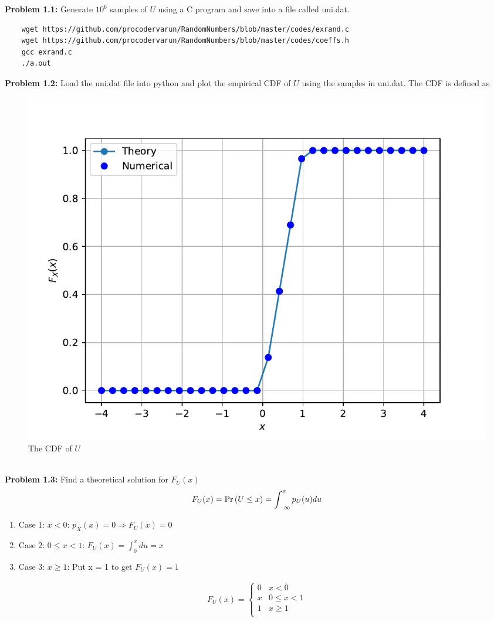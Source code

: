 \documentclass[journal,12pt,twocolumn]{IEEEtran}
\begin{document}

\textbf{Problem 1.1:} Generate $10^6$ samples of $U$ using a C program and save into a file called uni.dat.
\solution
\begin{lstlisting}
    wget https://github.com/procodervarun/RandomNumbers/blob/master/codes/exrand.c
    wget https://github.com/procodervarun/RandomNumbers/blob/master/codes/coeffs.h
    gcc exrand.c
    ./a.out
\end{lstlisting}
\textbf{Problem 1.2:} Load the uni.dat file into python and plot the empirical CDF of $U$ using the samples in uni.dat. The CDF is defined as\\
\solution
\begin{figure}[!ht]
\includegraphics[width=\columnwidth]{./figs/uni_cdf}
\caption{The CDF of $U$}
\label{fig:uni_cdf}
\end{figure}\\
\textbf{Problem 1.3:} Find a theoretical solution for $F_U(x)$\\
\solution 
\begin{align}
    F_U(x) = \Pr\left(U \leq x\right) = \int_{-\infty}^{x}p_U(u)du
\end{align}
\begin{enumerate}
    \item Case 1: $x < 0$: $p_X(x) = 0 \Rightarrow F_U(x) = 0$
    \item Case 2: $0 \leq x < 1$: $F_U(x) = \int_{0}^{x}du = x$
    \item Case 3: $x \geq 1$: Put x = 1 to get $F_U(x) = 1$ 
\end{enumerate}
\begin{align}
    F_U(x) = 
    \begin{cases}
        0 & x < 0 \\
        x & 0 \leq x < 1 \\
        1 & x \geq 1 \\
    \end{cases}
\end{align}
\end{document}
